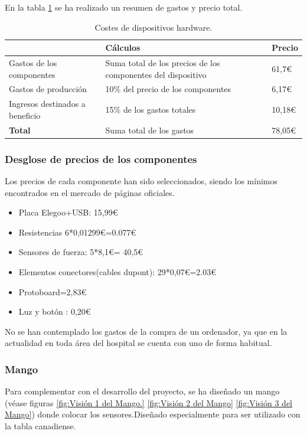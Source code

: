 En la tabla \ref{tab:costes_hardware} se ha realizado un resumen de gastos y precio total. 
\begin{table}[]
\centering
\begin{tabular}{|l|p{8cm}|l|}
\hline
\rowcolor[HTML]{BFBFBF} 
\textbf{} & \textbf{Cálculos} & \textbf{Precio} \\ \hline
Gastos de los componentes & Suma total de los precios de los componentes del dispositivo & 61,7€\\ \hline
Gastos de producción & 10\% del precio de los
 componentes & 6,17€\\ \hline
Ingresos destinados a beneficio & 15\% de los gastos totales & 10,18€\\ \hline
\textbf{Total}& Suma total de los gastos & 78,05€ \\ \hline
\end{tabular}
\caption{Costes de dispositivos hardware.}
\label{tab:costes_hardware}
\end{table}

\subsubsection{\textbf{Desglose de precios de los componentes}}
Los precios de cada componente han sido seleccionados, siendo los mínimos encontrados en el mercado de páginas oficiales.
\begin{itemize}
    \item Placa Elegoo+USB: 15,99€
    \item Resistencias 6*0,01299€=0.077€
    \item Sensores de fuerza: 5*8,1€= 40,5€
    \item Elementos conectores(cables dupont): 29*0,07€=2.03€
    \item Protoboard=2,83€
    \item Luz y botón : 0,20€
\end{itemize}
No se han contemplado los gastos de la compra de un ordenador, ya que en la actualidad en toda área del hospital se cuenta con uno de forma habitual. 

\subsubsection{Mango}

Para complementar con el desarrollo del proyecto, se ha diseñado un mango (véase figuras \ref{fig:Visión 1 del Mango.} \ref{fig:Visión 2 del Mango} \ref{fig:Visión 3 del Mango}) donde colocar los sensores.Diseñado especialmente para ser utilizado con la tabla canadiense. 

